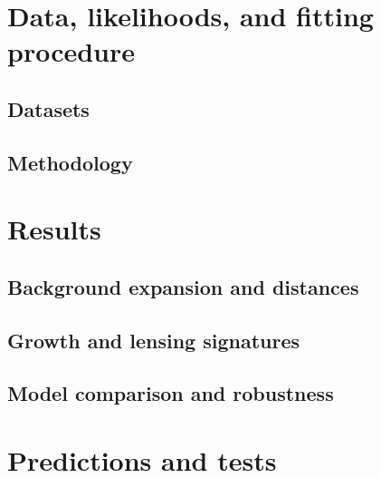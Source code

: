 \documentclass[a4paper,11pt]{article}
\begin{document}
\section{Data, likelihoods, and fitting procedure}
\label{sec:data}

\subsection{Datasets}

\subsection{Methodology}

\section{Results}
\label{sec:results}

\subsection{Background expansion and distances}

\subsection{Growth and lensing signatures}

\subsection{Model comparison and robustness}

\section{Predictions and tests}
\label{sec:predictions}
\end{document}
